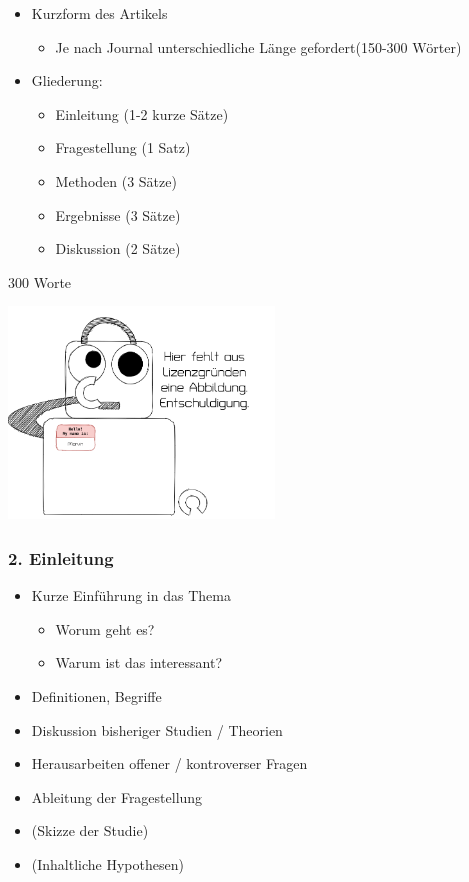 \documentclass[
]{book}
\providecommand{\tightlist}{%
  \setlength{\itemsep}{0pt}\setlength{\parskip}{0pt}}
\begin{document}
\begin{itemize}
\tightlist
\item
  Kurzform des Artikels

  \begin{itemize}
  \tightlist
  \item
    Je nach Journal unterschiedliche Länge gefordert(150-300 Wörter)
  \end{itemize}
\item
  Gliederung:

  \begin{itemize}
  \tightlist
  \item
    Einleitung (1-2 kurze Sätze)
  \item
    Fragestellung (1 Satz)
  \item
    Methoden (3 Sätze)
  \item
    Ergebnisse (3 Sätze)
  \item
    Diskussion (2 Sätze)
  \end{itemize}
\end{itemize}

300 Worte

\begin{center}\includegraphics[width=200pt]{imgs/copyright} \end{center}

\hypertarget{einleitung}{%
\subsubsection{2. Einleitung}\label{einleitung}}

\begin{itemize}
\item
  Kurze Einführung in das Thema

  \begin{itemize}
  \item
    Worum geht es?
  \item
    Warum ist das interessant?
  \end{itemize}
\item
  Definitionen, Begriffe
\item
  Diskussion bisheriger Studien / Theorien
\item
  Herausarbeiten offener / kontroverser Fragen
\item
  Ableitung der Fragestellung
\item
  (Skizze der Studie)
\item
  (Inhaltliche Hypothesen)
\end{itemize}
\end{document}
